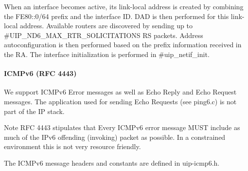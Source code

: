 When an interface becomes active, its link-\/local address is created by combining the F\+E80\+:\+:0/64 prefix and the interface ID. D\+AD is then performed for this link-\/local address. Available routers are discovered by sending up to \#\+U\+I\+P\+\_\+\+N\+D6\+\_\+\+M\+A\+X\+\_\+\+R\+T\+R\+\_\+\+S\+O\+L\+I\+C\+I\+T\+A\+T\+I\+O\+NS RS packets. Address autoconfiguration is then performed based on the prefix information received in the RA. The interface initialization is performed in \#uip\+\_\+netif\+\_\+init.\hypertarget{a00075_icmpv6}{}\paragraph{I\+C\+M\+Pv6 (\+R\+F\+C 4443)}\label{a00075_icmpv6}
We support I\+C\+M\+Pv6 Error messages as well as Echo Reply and Echo Request messages. The application used for sending Echo Requests (see ping6.\+c) is not part of the IP stack.

\begin{DoxyNote}{Note}
R\+FC 4443 stipulates that \textquotesingle{}Every I\+C\+M\+Pv6 error message M\+U\+ST include as much of the I\+Pv6 offending (invoking) packet as possible\textquotesingle{}. In a constrained environment this is not very resource friendly.
\end{DoxyNote}
The I\+C\+M\+Pv6 message headers and constants are defined in uip-\/icmp6.\+h.



